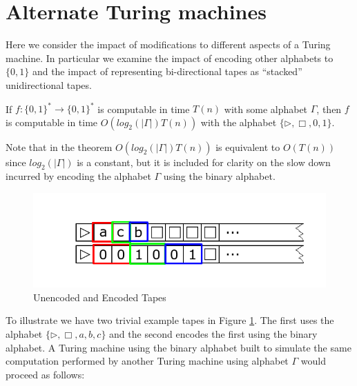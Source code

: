 \documentclass[usletter]{article}
\begin{document}
\section{Alternate Turing machines}

Here we consider the impact of modifications to different aspects of a Turing machine. In particular we examine the impact of encoding other alphabets to $\{0,1\}$ and the impact of representing bi-directional tapes as ``stacked'' unidirectional tapes.

\begin{theorem}
  If $f : \{0,1\}^* \rightarrow \{0,1\}^*$ is computable in time $T(n)$ with some alphabet $\Gamma$, then $f$ is computable in time $O(log_2(|\Gamma|)T(n))$ with the alphabet $\{\rhd,\Box, 0, 1\}$.
\end{theorem}

Note that in the theorem $O(log_2(|\Gamma|)T(n))$ is equivalent to $O(T(n))$ since $log_2(|\Gamma|)$ is a constant, but it is included for clarity on the slow down incurred by encoding the alphabet $\Gamma$ using the binary alphabet.

\begin{figure}
\begin{center}
\includegraphics[width=1\textwidth]{lectures/graphics/encoding}
\end{center}
\caption{Unencoded and Encoded Tapes}
\label{fig:encoding}
\end{figure}

To illustrate we have two trivial example tapes in Figure \ref{fig:encoding}. The first uses the alphabet $\{\rhd, \Box, a, b, c\}$ and the second encodes the first using the binary alphabet. A Turing machine using the binary alphabet built to simulate the same computation performed by another Turing machine using alphabet $\Gamma$ would proceed as follows:
\end{document}
